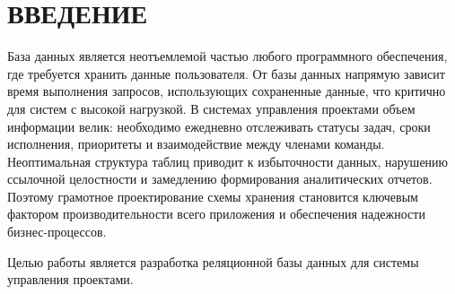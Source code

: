 \section*{ВВЕДЕНИЕ}

База данных является неотъемлемой частью любого программного обеспечения,
где требуется хранить данные пользователя.
От базы данных напрямую зависит время выполнения запросов, использующих сохраненные данные,
что критично для систем с высокой нагрузкой.
В системах управления проектами объем информации велик: необходимо ежедневно отслеживать статусы задач, сроки исполнения, приоритеты и взаимодействие между членами команды. Неоптимальная структура таблиц приводит к избыточности данных, нарушению ссылочной целостности и замедлению формирования аналитических отчетов. Поэтому грамотное проектирование схемы хранения становится ключевым фактором производительности всего приложения и обеспечения надежности бизнес-процессов.

Целью работы является разработка реляционной базы данных для системы управления проектами.

